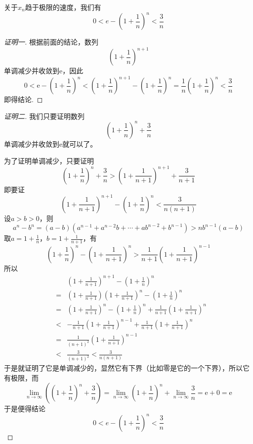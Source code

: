 关于$x_n$趋于极限的速度，我们有
\[ 0 < e-\left( 1 + \frac{1}{n} \right)^n < \frac{3}{n} \]
\begin{proof}[证明一]
  根据前面的结论，数列
  \[ \left( 1+\frac{1}{n} \right)^{n+1} \]
  单调减少并收敛到$\mathrm{e}$，因此
  \[ 0 < \mathrm{e} - \left( 1+\frac{1}{n} \right)^n < \left( 1+\frac{1}{n} \right)^{n+1} - \left( 1+\frac{1}{n} \right)^{n} = \frac{1}{n} \left( 1+\frac{1}{n} \right)^{n} < \frac{3}{n} \]
  即得结论.
\end{proof}

\begin{proof}[证明二]
  我们只要证明数列
  \[ \left( 1 + \frac{1}{n} \right)^n + \frac{3}{n} \]
  单调减少并收敛到$\mathrm{e}$就可以了。

  为了证明单调减少，只要证明
  \[ \left( 1 + \frac{1}{n} \right)^n + \frac{3}{n} > \left( 1 + \frac{1}{n+1} \right)^{n+1} + \frac{3}{n+1} \]
  即要证
  \[ \left( 1 + \frac{1}{n+1} \right)^{n+1} - \left( 1 + \frac{1}{n} \right)^n < \frac{3}{n(n+1)} \]
  设$a>b>0$，则
  \[ a^n-b^n=(a-b)(a^{n-1}+a^{n-2}b+\cdots+ab^{n-2}+b^{n-1})>nb^{n-1}(a-b) \]
  取$a=1+\frac{1}{n}$，$b=1+\frac{1}{n+1}$，有
  \[ \left( 1 + \frac{1}{n} \right)^{n} - \left( 1 + \frac{1}{n+1} \right)^{n} >\frac{1}{n+1}\left( 1+\frac{1}{n+1} \right)^{n-1} \]
  所以
  \begin{eqnarray*}
    && \left( 1 + \frac{1}{n+1} \right)^{n+1} - \left( 1 + \frac{1}{n} \right)^n \\
    & = & \left( 1 + \frac{1}{n+1} \right)\left( 1 + \frac{1}{n+1} \right)^{n} - \left( 1 + \frac{1}{n} \right)^n \\
    & = & \left( 1 + \frac{1}{n+1} \right)^{n} - \left( 1 + \frac{1}{n} \right)^n + \frac{1}{n+1} \left( 1 + \frac{1}{n+1} \right)^{n} \\
    & < & -\frac{1}{n+1}\left( 1+\frac{1}{n+1} \right)^{n-1} + \frac{1}{n+1} \left( 1 + \frac{1}{n+1} \right)^{n} \\
    & = & \frac{1}{(n+1)^2}\left( 1+\frac{1}{n+1} \right)^{n-1} \\
    & < & \frac{3}{(n+1)^2} < \frac{3}{n(n+1)}
  \end{eqnarray*}
  于是就证明了它是单调减少的，显然它有下界（比如零是它的一个下界），所以它有极限，而
  \[ \lim_{n \to \infty} \left( \left(1+\frac{1}{n} \right)^n + \frac{3}{n} \right) = \lim_{n \to \infty}\left( 1+\frac{1}{n} \right)^n + \lim_{n \to \infty} \frac{3}{n} = \mathrm{e} + 0 = \mathrm{e} \]
    于是便得结论
\[ 0 < e-\left( 1 + \frac{1}{n} \right)^n < \frac{3}{n} \]
\end{proof}

